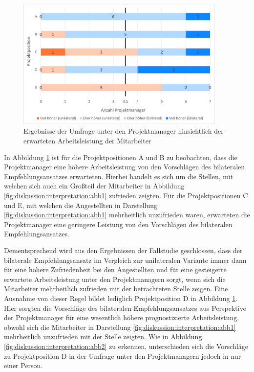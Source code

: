 \begin{figure}[h]
	\centering
	\includegraphics[width=0.925\textwidth]{gfx/ergebnisse-projektmanager-arbeitsleistung.png}	
	\caption{Ergebnisse der Umfrage unter den Projektmanager hinsichtlich der erwarteten Arbeitsleistung der Mitarbeiter}
	\label{fig:diskussion:interpretation:abb4}
\end{figure}

In Abbildung \ref{fig:diskussion:interpretation:abb4} ist für die Projektpositionen A und B zu beobachten, dass die Projektmanager eine höhere Arbeitsleistung von den Vorschlägen des bilateralen Empfehlungsansatzes erwarteten. Hierbei handelt es sich um die Stellen, mit welchen sich auch ein Großteil der Mitarbeiter in Abbildung \ref{fig:diskussion:interpretation:abb1} zufrieden zeigten. Für die Projektpositionen C und E, mit welchen die Angestellten in Darstellung \ref{fig:diskussion:interpretation:abb1} mehrheitlich unzufrieden waren, erwarteten die Projektmanager eine geringere Leistung von den Vorschlägen des bilateralen Empfehlungsansatzes.

Dementsprechend wird aus den Ergebnissen der Fallstudie geschlossen, dass der bilaterale Empfehlungsansatz im Vergleich zur unilateralen Variante immer dann für eine höhere Zufriedenheit bei den Angestellten und für eine gesteigerte erwartete Arbeitsleistung unter den Projektmanagern sorgt, wenn sich die Mitarbeiter mehrheitlich zufrieden mit der betrachteten Stelle zeigen. Eine Ausnahme von dieser Regel bildet lediglich Projektposition D in Abbildung \ref{fig:diskussion:interpretation:abb4}. Hier sorgten die Vorschläge des bilateralen Empfehlungsansatzes aus Perspektive der Projektmanager für eine wesentlich höhere prognostizierte Arbeitsleistung, obwohl sich die Mitarbeiter in Darstellung \ref{fig:diskussion:interpretation:abb1} mehrheitlich unzufrieden mit der Stelle zeigten. Wie in Abbildung \ref{fig:diskussion:interpretation:abb2} zu erkennen, unterschieden sich die Vorschläge zu Projektposition D in der Umfrage unter den Projektmanagern jedoch in nur einer Person.

